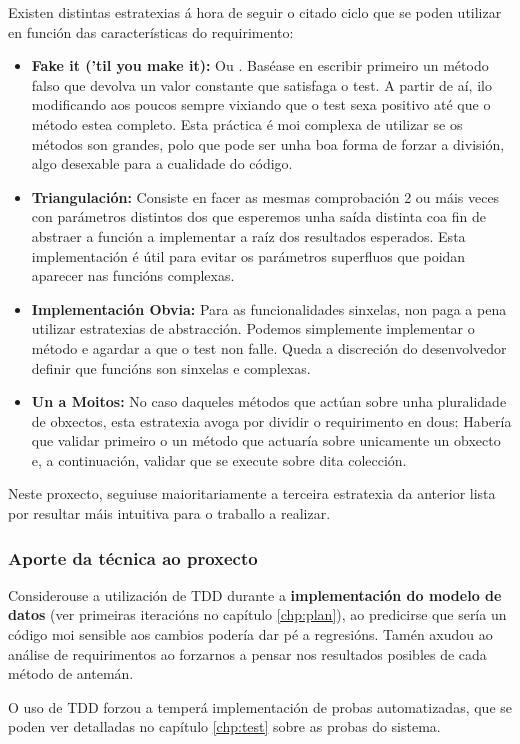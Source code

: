 Existen distintas estratexias á hora de seguir o citado ciclo \cite{tdd} que se poden utilizar en función das características do requirimento:

\begin{itemize}
	\item \textbf{Fake it ('til you make it):} Ou . Baséase en escribir primeiro un método falso que devolva un valor constante que satisfaga o test. A partir de aí, ilo modificando aos poucos sempre vixiando que o test sexa positivo até que o método estea completo. Esta práctica é moi complexa de utilizar se os métodos son grandes, polo que pode ser unha boa forma de forzar a división, algo desexable para a cualidade do código.
	
	\item \textbf{Triangulación:} Consiste en facer as mesmas comprobación 2 ou máis veces con parámetros distintos dos que esperemos unha saída distinta coa fin de abstraer a función a implementar a raíz dos resultados esperados. Esta implementación é útil para evitar os parámetros superfluos que poidan aparecer nas funcións complexas.
	
	\item \textbf{Implementación Obvia:} Para as funcionalidades sinxelas, non paga a pena utilizar estratexias de abstracción. Podemos simplemente implementar o método e agardar a que o test non falle. Queda a discreción do desenvolvedor definir que funcións son sinxelas e complexas.
	
	\item \textbf{Un a Moitos:} No caso daqueles métodos que actúan sobre unha pluralidade de obxectos, esta estratexia avoga por dividir o requirimento en dous: Habería que validar primeiro o un método que actuaría sobre unicamente un obxecto e, a continuación, validar que se execute sobre dita colección.  

\end{itemize}


Neste proxecto, seguiuse maioritariamente a terceira estratexia da anterior lista por resultar máis intuitiva para o traballo a realizar.

\subsubsection{Aporte da técnica ao proxecto}

Considerouse a utilización de TDD durante a \textbf{implementación do modelo de datos} (ver primeiras iteracións no capítulo \ref{chp:plan}), ao predicirse que sería un código moi sensible aos cambios podería dar pé a regresións. Tamén axudou ao análise de requirimentos ao forzarnos a pensar nos resultados posibles de cada método de antemán.

O uso de TDD forzou a temperá implementación de probas automatizadas, que se poden ver detalladas no capítulo \ref{chp:test} sobre as probas do sistema.


